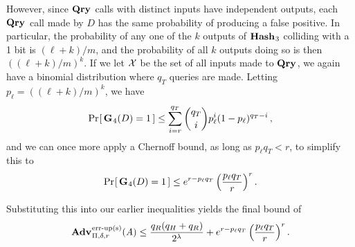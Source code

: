 However, since $\textup{\textbf{Qry}}\hspace{0.5pt}$ calls with distinct inputs have independent outputs, each $\textup{\textbf{Qry}}\hspace{0.5pt}$ call made by $D$ has the same probability of producing a false positive. In particular, the probability of any one of the $k$ outputs of $\textup{\textbf{Hash}}\hspace{0.5pt}_3$ colliding with a 1 bit is $(\ell+k)/m$, and the probability of all $k$ outputs doing so is then $((\ell+k)/m)^k$. If we let $\mathcal{X}$ be the set of all inputs made to $\textup{\textbf{Qry}}\hspace{0.5pt}$, we again have a binomial distribution where $q_T$ queries are made. Letting $p_\ell = ((\ell+k)/m)^k$, we have
\begin{equation}
   \Pr\hspace{-1pt}\left[\,\textup{\textbf{G}}\hspace{0.5pt}_4(D)=1\,\right] \le
     \sum_{i=r}^{q_T} \binom{q_T}{i}p_\ell^i(1-p_\ell)^{q_T-i} \,,
\end{equation}
and we can once more apply a Chernoff bound, as long as $p_\ell q_T < r$, to simplify this to
\begin{equation}
   \Pr\hspace{-1pt}\left[\,\textup{\textbf{G}}\hspace{0.5pt}_4(D)=1\,\right] \le
     e^{r-p_\ell q_T}\left(\frac{p_\ell q_T}{r}\right)^r.
\end{equation}

Substituting this into our earlier inequalities yields the final bound of
\begin{equation}
   \Adv{\erreps}_{\Pi,\delta,r}(\advA) \leq
     \frac{q_R(q_H+q_R)}{2^\lambda} + e^{r-p_\ell q_T}\left(\frac{p_\ell q_T}{r}\right)^r.
\end{equation}